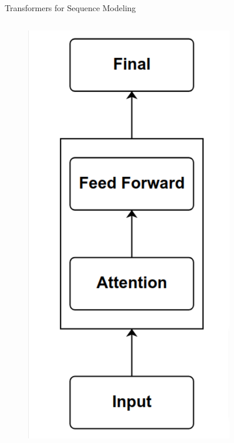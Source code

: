 \begin{frame}[c]{Transformers for Sequence Modeling}
\begin{columns}
\begin{column}{0.7\textwidth}
    \begin{figure}
        \centering
        \includegraphics[height=0.8\textheight,  clip,trim={0.1cm 0.1cm 0.1cm 0.1cm}]{Figs/out.png}
    \end{figure}
    \end{column}
    \end{columns}        

\end{frame}

